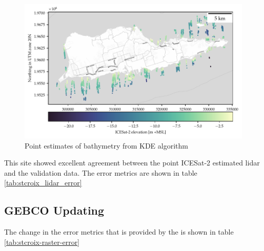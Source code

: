 \begin{figure}[h]
    \centering
    \includegraphics[width=\textwidth]{figures/Stcroix_photon_map.pdf}
    \caption{Point estimates of bathymetry from KDE algorithm }
    \label{fig:stcroix-bathy-points}
\end{figure}

This site showed excellent agreement between the point ICESat-2 estimated lidar and the validation data. The error metrics are shown in table \ref{tab:stcroix_lidar_error}



\subsection{GEBCO Updating}

The change in the error metrics that is provided by the  is shown in table \ref{tab:stcroix-raster-error}



